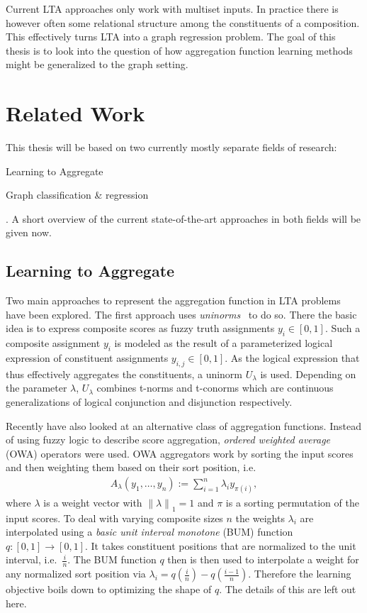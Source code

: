 \documentclass[12pt]{scrartcl}
\begin{document}
Current LTA approaches only work with multiset inputs.
In practice there is however often some relational structure among the constituents of a composition.
This effectively turns LTA into a graph regression problem.
The goal of this thesis is to look into the question of how aggregation function learning methods might be generalized to the graph setting.

\section{Related Work}%
\label{sec:related-work}

This thesis will be based on two currently mostly separate fields of research:
\begin{enumerate*}[label=\textbf{\arabic*.}]
	\item Learning to Aggregate
	\item Graph classification \& regression
\end{enumerate*}.
A short overview of the current state-of-the-art approaches in both fields will be given now.

\subsection{Learning to Aggregate}%
\label{sec:related-work:lta}

Two main approaches to represent the aggregation function in LTA problems have been explored.
The first approach uses \textit{uninorms}~\cite{Melnikov2016} to do so.
There the basic idea is to express composite scores as fuzzy truth assignments $y_i \in [0, 1]$.
Such a composite assignment $y_i$ is modeled as the result of a parameterized logical expression of constituent assignments $y_{i,j} \in [0, 1]$.
As the logical expression that thus effectively aggregates the constituents, a uninorm $U_{\lambda}$ is used.
Depending on the parameter $\lambda$, $U_{\lambda}$ combines t-norms and t-conorms which are continuous generalizations of logical conjunction and disjunction respectively.

Recently \citet{Melnikov2019} have also looked at an alternative class of aggregation functions.
Instead of using fuzzy logic to describe score aggregation, \textit{ordered weighted average} (OWA) operators were used.
OWA aggregators work by sorting the input scores and then weighting them based on their sort position, i.e.\ %
\begin{align*}
	A_{\lambda}(y_1, \dots, y_n) := \sum_{i = 1}^n \lambda_i y_{\pi(i)},
\end{align*}
where $\lambda$ is a weight vector with ${\|\lambda\|}_1 = 1$ and $\pi$ is a sorting permutation of the input scores. %
To deal with varying composite sizes $n$ the weights $\lambda_i$ are interpolated using a \textit{basic unit interval monotone} (BUM) function $q: [0, 1] \to [0, 1]$.
It takes constituent positions that are normalized to the unit interval, i.e.\ $\frac{i}{n}$.
The BUM function $q$ then is then used to interpolate a weight for any normalized sort position via $\lambda_i = q(\frac{i}{n}) - q(\frac{i - 1}{n})$.
Therefore the learning objective boils down to optimizing the shape of $q$.
The details of this are left out here.
\end{document}
